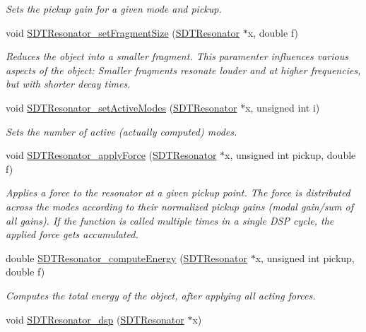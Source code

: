 \begin{DoxyCompactItemize}
\begin{DoxyCompactList}\small\item\em Sets the pickup gain for a given mode and pickup. \end{DoxyCompactList}\item 
void \hyperlink{group__resonators_gac5470752ba965676b14985d17d371f10}{S\+D\+T\+Resonator\+\_\+set\+Fragment\+Size} (\hyperlink{group__resonators_ga07d183de45e9713277c8f62d93d9be9c}{S\+D\+T\+Resonator} $\ast$x, double f)
\begin{DoxyCompactList}\small\item\em Reduces the object into a smaller fragment. This paramenter influences various aspects of the object\+: Smaller fragments resonate louder and at higher frequencies, but with shorter decay times. \end{DoxyCompactList}\item 
void \hyperlink{group__resonators_ga37a78caeccdbaefbc4b7f842b110b7ee}{S\+D\+T\+Resonator\+\_\+set\+Active\+Modes} (\hyperlink{group__resonators_ga07d183de45e9713277c8f62d93d9be9c}{S\+D\+T\+Resonator} $\ast$x, unsigned int i)
\begin{DoxyCompactList}\small\item\em Sets the number of active (actually computed) modes. \end{DoxyCompactList}\item 
void \hyperlink{group__resonators_ga9d63332360ee72a9bbcb1dcd85d877a5}{S\+D\+T\+Resonator\+\_\+apply\+Force} (\hyperlink{group__resonators_ga07d183de45e9713277c8f62d93d9be9c}{S\+D\+T\+Resonator} $\ast$x, unsigned int pickup, double f)
\begin{DoxyCompactList}\small\item\em Applies a force to the resonator at a given pickup point. The force is distributed across the modes according to their normalized pickup gains (modal gain/sum of all gains). If the function is called multiple times in a single D\+S\+P cycle, the applied force gets accumulated. \end{DoxyCompactList}\item 
double \hyperlink{group__resonators_gaa214d594ac8beedee4e233f154cc95e9}{S\+D\+T\+Resonator\+\_\+compute\+Energy} (\hyperlink{group__resonators_ga07d183de45e9713277c8f62d93d9be9c}{S\+D\+T\+Resonator} $\ast$x, unsigned int pickup, double f)
\begin{DoxyCompactList}\small\item\em Computes the total energy of the object, after applying all acting forces. \end{DoxyCompactList}\item 
\hypertarget{group__resonators_ga5aff90f4cf699af25c1b30b81a05f693}{}void \hyperlink{group__resonators_ga5aff90f4cf699af25c1b30b81a05f693}{S\+D\+T\+Resonator\+\_\+dsp} (\hyperlink{group__resonators_ga07d183de45e9713277c8f62d93d9be9c}{S\+D\+T\+Resonator} $\ast$x)\label{group__resonators_ga5aff90f4cf699af25c1b30b81a05f693}


\end{DoxyCompactItemize}
